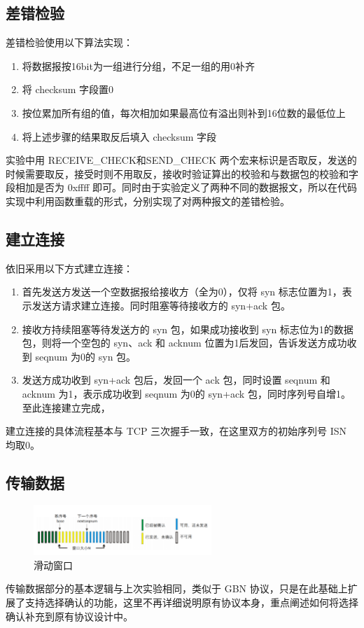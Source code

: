 \documentclass[UTF8,a4paper,10pt]{ctexart}
\begin{document}
\subsection{差错检验}
差错检验使用以下算法实现：
\begin{enumerate}
    \item 将数据报按16bit为一组进行分组，不足一组的用0补齐
    \item 将 checksum 字段置0
    \item 按位累加所有组的值，每次相加如果最高位有溢出则补到16位数的最低位上
    \item 将上述步骤的结果取反后填入 checksum 字段
\end{enumerate}\par
实验中用 RECEIVE\_CHECK和SEND\_CHECK 两个宏来标识是否取反，发送的时候需要取反，接受时则不用取反，接收时验证算出的校验和与数据包的校验和字段相加是否为 0xffff 即可。同时由于实验定义了两种不同的数据报文，所以在代码实现中利用函数重载的形式，分别实现了对两种报文的差错检验。

\subsection{建立连接}
依旧采用以下方式建立连接：
\begin{enumerate}
    \item 首先发送方发送一个空数据报给接收方（全为0），仅将 syn 标志位置为1，表示发送方请求建立连接。同时阻塞等待接收方的 syn+ack 包。
    \item 接收方持续阻塞等待发送方的 syn 包，如果成功接收到 syn 标志位为1的数据包，则将一个空包的 syn、ack 和 acknum 位置为1后发回，告诉发送方成功收到 seqnum 为0的 syn 包。
    \item 发送方成功收到 syn+ack 包后，发回一个 ack 包，同时设置 seqnum 和 acknum 为1，表示成功收到 seqnum 为0的 syn+ack 包，同时序列号自增1。至此连接建立完成，
\end{enumerate}\par
建立连接的具体流程基本与 TCP 三次握手一致，在这里双方的初始序列号 ISN 均取0。

\subsection{传输数据}
\begin{figure}[H]
    \centering
\includegraphics[width=0.6\textwidth]{img/滑动窗口.png}
    \caption{滑动窗口}
\end{figure}
传输数据部分的基本逻辑与上次实验相同，类似于 GBN 协议，只是在此基础上扩展了支持选择确认的功能，这里不再详细说明原有协议本身，重点阐述如何将选择确认补充到原有协议设计中。
\end{document}
